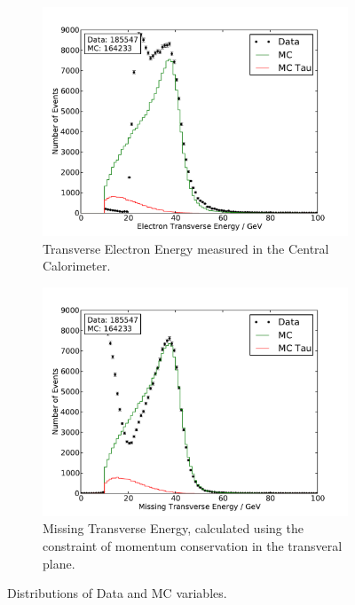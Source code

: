 \documentclass[
	paper=A4,
	parskip=full,
	chapterprefix=true,
	11pt,
	headings=normal,
	bibliography=totoc,
	listof=totoc,
	titlepage=on,
]{scrreprt}
\begin{document}
\begin{figure}%
	\centering
	\begin{subfigure}{0.45\textwidth}
		\includegraphics{./nocuts/E_T_el}
		\caption{Transverse Electron Energy measured in the Central Calorimeter.}
	\end{subfigure}
	\begin{subfigure}{0.45\textwidth}
		\includegraphics{./nocuts/E_T_miss}
		\caption{Missing Transverse Energy, calculated using the constraint of momentum conservation in the transveral plane.}
	\end{subfigure}
	\caption{Distributions of Data and MC variables.}
	\label{fig:no_cuts_Etmet}
\end{figure}
\end{document}
